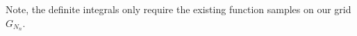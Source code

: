 %
%

Note, the definite integrals only require the existing function samples on our grid $G_{N_n}$. 

